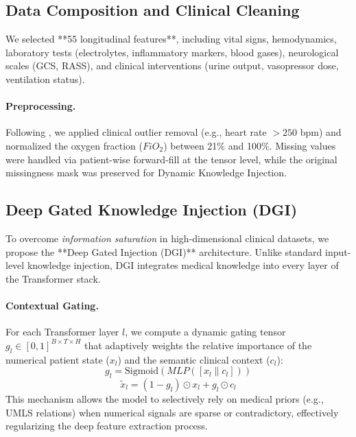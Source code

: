 \subsection{Data Composition and Clinical Cleaning}
We selected **55 longitudinal features**, including vital signs, hemodynamics, laboratory tests (electrolytes, inflammatory markers, blood gases), neurological scales (GCS, RASS), and clinical interventions (urine output, vasopressor dose, ventilation status). 

\paragraph{Preprocessing.} Following \cite{huang2025}, we applied clinical outlier removal (e.g., heart rate $> 250$ bpm) and normalized the oxygen fraction ($FiO_2$) between 21\% and 100\%. Missing values were handled via patient-wise forward-fill at the tensor level, while the original missingness mask was preserved for Dynamic Knowledge Injection.

\subsection{Deep Gated Knowledge Injection (DGI)}
To overcome \textit{information saturation} in high-dimensional clinical datasets, we propose the **Deep Gated Injection (DGI)** architecture. Unlike standard input-level knowledge injection, DGI integrates medical knowledge into every layer of the Transformer stack.

\paragraph{Contextual Gating.}
For each Transformer layer $l$, we compute a dynamic gating tensor $g_l \in [0, 1]^{B \times T \times H}$ that adaptively weights the relative importance of the numerical patient state ($x_l$) and the semantic clinical context ($c_l$):
\begin{equation}
    g_l = \text{Sigmoid}(MLP([x_l \parallel c_l]))
\end{equation}
\begin{equation}
    \tilde{x}_l = (1 - g_l) \odot x_l + g_l \odot c_l
\end{equation}
This mechanism allows the model to selectively rely on medical priors (e.g., UMLS relations) when numerical signals are sparse or contradictory, effectively regularizing the deep feature extraction process.
